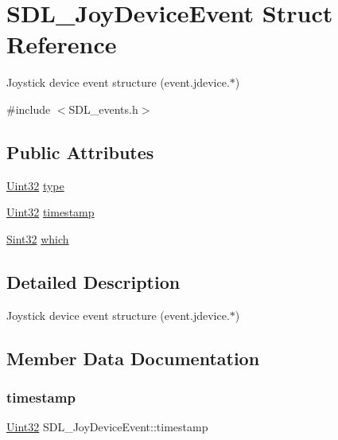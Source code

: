 \hypertarget{struct_s_d_l___joy_device_event}{}\section{S\+D\+L\+\_\+\+Joy\+Device\+Event Struct Reference}
\label{struct_s_d_l___joy_device_event}


Joystick device event structure (event.\+jdevice.$\ast$)  




{\ttfamily \#include $<$S\+D\+L\+\_\+events.\+h$>$}

\subsection*{Public Attributes}
\begin{DoxyCompactItemize}
\item 
\hyperlink{_s_d_l__stdinc_8h_add440eff171ea5f55cb00c4a9ab8672d}{Uint32} \hyperlink{struct_s_d_l___joy_device_event_a51f060ba1dd5669b458e9c97aece667e}{type}
\item 
\hyperlink{_s_d_l__stdinc_8h_add440eff171ea5f55cb00c4a9ab8672d}{Uint32} \hyperlink{struct_s_d_l___joy_device_event_a5c4a9271bfff5d5c2e09a0dc732df8f3}{timestamp}
\item 
\hyperlink{_s_d_l__stdinc_8h_a7a90b941db9d4582e9ad7abb9940ff7e}{Sint32} \hyperlink{struct_s_d_l___joy_device_event_af9b295798f033b799ebbda7de6cb5a7e}{which}
\end{DoxyCompactItemize}


\subsection{Detailed Description}
Joystick device event structure (event.\+jdevice.$\ast$) 

\subsection{Member Data Documentation}
\mbox{\label{struct_s_d_l___joy_device_event_a5c4a9271bfff5d5c2e09a0dc732df8f3}} 
\subsubsection{\texorpdfstring{timestamp}{timestamp}}
{\footnotesize\ttfamily \hyperlink{_s_d_l__stdinc_8h_add440eff171ea5f55cb00c4a9ab8672d}{Uint32} S\+D\+L\+\_\+\+Joy\+Device\+Event\+::timestamp}

